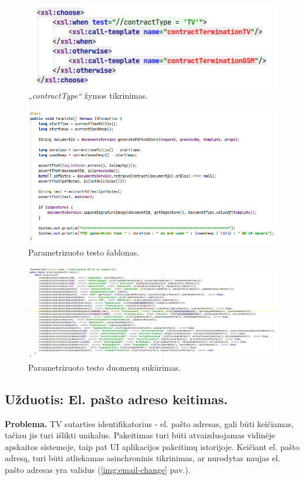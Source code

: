 \begin{figure}[H]
    \centering
    \includegraphics[scale=0.5]{img/contractType.png}
    \caption{\textit{„contractType“} žymos tikrinimas.}
    \label{img:contractType}
\end{figure}

\begin{figure}[H]
    \centering
    \includegraphics[scale=0.5]{img/template.png}
    \caption{Parametrizuoto testo šablonas.}
    \label{img:template}
\end{figure}

\begin{figure}[H]
    \centering
    \includegraphics[scale=0.3]{img/param-tests.png}
    \caption{Parametrizuoto testo duomenų sukūrimas.}
    \label{img:param-tests}
\end{figure}


\subsection{Užduotis: El. pašto adreso keitimas.}
\textbf{Problema.} TV sutarties identifikatorius - el. pašto adresas, gali būti keičiamas, tačiau jis turi išlikti unikalus.
Pakeitimas turi būti atvaizduojamas vidinėje apskaitos sistemoje, taip pat UI aplikacijos pakeitimų istorijoje. Keičiant el. pašto adresą, turi būti
atliekamas asinchroninis tikrinimas, ar nurodytas naujas el. pašto adresas yra validus (\ref{img:email-change} pav.).


